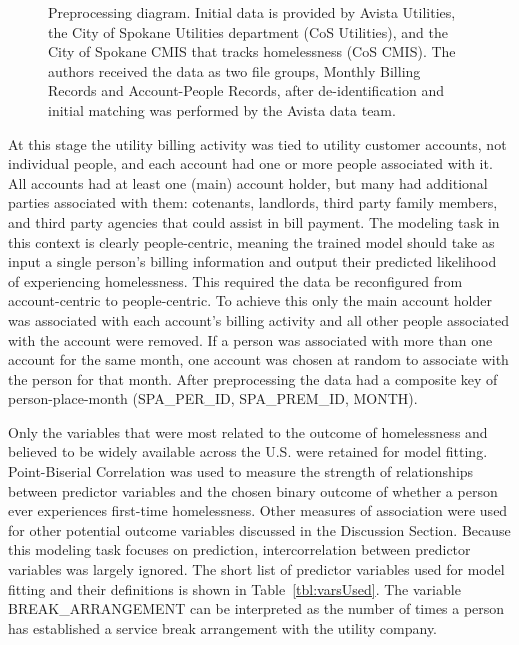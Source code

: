 \documentclass[10pt,letterpaper]{article}
\begin{document}
\begin{figure}[!h]
    \caption{Preprocessing diagram. Initial data is provided by Avista Utilities, the City of Spokane Utilities department (CoS Utilities), and the City of Spokane CMIS that tracks homelessness (CoS CMIS). The authors received the data as two file groups, Monthly Billing Records and Account-People Records, after de-identification and initial matching was performed by the Avista data team.}
    \label{fig:preprocessing}
\end{figure}

At this stage the utility billing activity was tied to utility customer accounts, not individual people, and each account had one or more people associated with it. All accounts had at least one (main) account holder, but many had additional parties associated with them: cotenants, landlords, third party family members, and third party agencies that could assist in bill payment. The modeling task in this context is clearly people-centric, meaning the trained model should take as input a single person's billing information and output their predicted likelihood of experiencing homelessness. This required the data be reconfigured from account-centric to people-centric. To achieve this only the main account holder was associated with each account's billing activity and all other people associated with the account were removed. If a person was associated with more than one account for the same month, one account was chosen at random to associate with the person for that month. After preprocessing the data had a composite key of person-place-month (SPA\_PER\_ID, SPA\_PREM\_ID, MONTH).

Only the variables that were most related to the outcome of homelessness and believed to be widely available across the U.S. were retained for model fitting. Point-Biserial Correlation was used to measure the strength of relationships between predictor variables and the chosen binary outcome of whether a person ever experiences first-time homelessness. Other measures of association were used for other potential outcome variables discussed in the Discussion Section. Because this modeling task focuses on prediction, intercorrelation between predictor variables was largely ignored. The short list of predictor variables used for model fitting and their definitions is shown in Table~\ref{tbl:varsUsed}. The variable BREAK\_ARRANGEMENT can be interpreted as the number of times a person has established a service break arrangement with the utility company.
\end{document}
